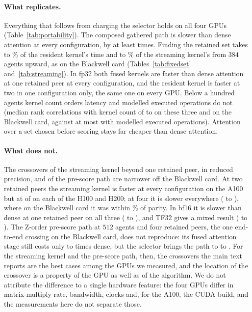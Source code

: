 \paragraph{What replicates.} Everything that follows from charging the
selector holds on all four GPUs (Table~\ref{tab:portability}). The
composed gathered path is slower than dense attention at every configuration,
by at least \PortComposedMin{} times. Finding the retained set takes
\PortFindLo{} to \PortFindHi{}\% of the resident kernel's time and
\PortStreamFindLo{} to \PortStreamFindHi{}\% of the streaming kernel's from $384$
agents upward, as on the Blackwell card (Tables~\ref{tab:fixedset}
and~\ref{tab:streaming}). In fp32 both fused
kernels are faster than dense attention at one retained peer at every
configuration, and the resident kernel is faster at two in one configuration
only, the same one on every GPU. Below a hundred agents kernel count orders
latency and modelled executed operations do not (median rank correlations with kernel
count of \PortSmallNRhoLaunchLo{} to \PortSmallNRhoLaunchHi{} on these three and
\SmallNRhoLaunch{} on the Blackwell card, against at most
\PortSmallNRhoFlopsHi{} with modelled executed operations). Attention over a set chosen before scoring stays far
cheaper than dense attention.

\paragraph{What does not.} The crossovers of the streaming kernel beyond one
retained peer, in reduced precision, and of the pre-score path are narrower off
the Blackwell card.
At two retained peers the streaming kernel is faster at every configuration on
the A100 but at \PortStreamTwoHopperWins{} of \PortStreamTwoConfigs{} on each
of the H100 and H200; at four it is slower everywhere (\PortStreamFourLo{} to
\PortStreamFourHi{}), where on the Blackwell card it was within \StreamKFourDev{}\% of parity.
In bf16 it is slower than dense at one retained peer on all three
(\PortBfOneLo{} to \PortBfOneHi{}), and TF32 gives a mixed result
(\PortTfOneLo{} to \PortTfOneHi{}). The Z-order pre-score path at $512$ agents and
four retained peers, the one end-to-end crossing on the Blackwell card, does
not reproduce: its fused attention stage still costs only \PortZorderAttendLo{}
to \PortZorderAttendHi{} times dense, but the selector brings the path to
\PortZorderTotalLo{} to \PortZorderTotalHi{}. For the streaming kernel and the
pre-score path, then, the crossovers the main text reports are the best cases
among the GPUs we measured, and the location of the crossover is a property of
the GPU as well as of the algorithm. We do not attribute the difference to a
single hardware feature: the four GPUs differ in matrix-multiply rate, bandwidth,
clocks and, for the A100, the CUDA build, and the measurements here do not
separate those.

